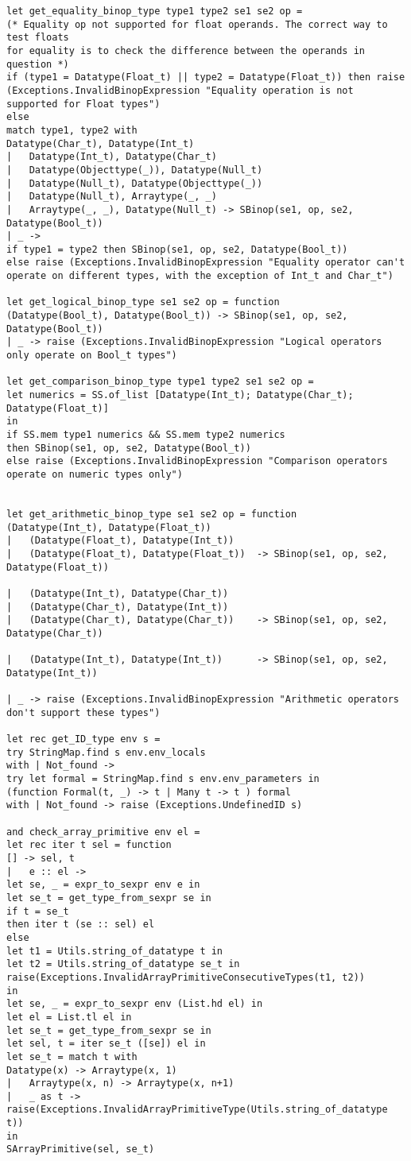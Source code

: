 \begin{verbatim}
let get_equality_binop_type type1 type2 se1 se2 op = 
(* Equality op not supported for float operands. The correct way to test floats 
for equality is to check the difference between the operands in question *)
if (type1 = Datatype(Float_t) || type2 = Datatype(Float_t)) then raise (Exceptions.InvalidBinopExpression "Equality operation is not supported for Float types")
else 
match type1, type2 with
Datatype(Char_t), Datatype(Int_t) 
| 	Datatype(Int_t), Datatype(Char_t)
| 	Datatype(Objecttype(_)), Datatype(Null_t)
| 	Datatype(Null_t), Datatype(Objecttype(_))
| 	Datatype(Null_t), Arraytype(_, _)
| 	Arraytype(_, _), Datatype(Null_t) -> SBinop(se1, op, se2, Datatype(Bool_t))
| _ ->
if type1 = type2 then SBinop(se1, op, se2, Datatype(Bool_t))
else raise (Exceptions.InvalidBinopExpression "Equality operator can't operate on different types, with the exception of Int_t and Char_t")

let get_logical_binop_type se1 se2 op = function 
(Datatype(Bool_t), Datatype(Bool_t)) -> SBinop(se1, op, se2, Datatype(Bool_t))
| _ -> raise (Exceptions.InvalidBinopExpression "Logical operators only operate on Bool_t types")

let get_comparison_binop_type type1 type2 se1 se2 op =  
let numerics = SS.of_list [Datatype(Int_t); Datatype(Char_t); Datatype(Float_t)]
in
if SS.mem type1 numerics && SS.mem type2 numerics
then SBinop(se1, op, se2, Datatype(Bool_t))
else raise (Exceptions.InvalidBinopExpression "Comparison operators operate on numeric types only")


let get_arithmetic_binop_type se1 se2 op = function 
(Datatype(Int_t), Datatype(Float_t)) 
| 	(Datatype(Float_t), Datatype(Int_t)) 
| 	(Datatype(Float_t), Datatype(Float_t)) 	-> SBinop(se1, op, se2, Datatype(Float_t))

| 	(Datatype(Int_t), Datatype(Char_t)) 
| 	(Datatype(Char_t), Datatype(Int_t)) 
| 	(Datatype(Char_t), Datatype(Char_t)) 	-> SBinop(se1, op, se2, Datatype(Char_t))

| 	(Datatype(Int_t), Datatype(Int_t)) 		-> SBinop(se1, op, se2, Datatype(Int_t))

| _ -> raise (Exceptions.InvalidBinopExpression "Arithmetic operators don't support these types")

let rec get_ID_type env s = 
try StringMap.find s env.env_locals
with | Not_found -> 
try let formal = StringMap.find s env.env_parameters in
(function Formal(t, _) -> t | Many t -> t ) formal
with | Not_found -> raise (Exceptions.UndefinedID s)

and check_array_primitive env el = 
let rec iter t sel = function
[] -> sel, t
| 	e :: el -> 
let se, _ = expr_to_sexpr env e in
let se_t = get_type_from_sexpr se in
if t = se_t 
then iter t (se :: sel) el 
else
let t1 = Utils.string_of_datatype t in
let t2 = Utils.string_of_datatype se_t in 
raise(Exceptions.InvalidArrayPrimitiveConsecutiveTypes(t1, t2))
in
let se, _ = expr_to_sexpr env (List.hd el) in
let el = List.tl el in
let se_t = get_type_from_sexpr se in
let sel, t = iter se_t ([se]) el in
let se_t = match t with
Datatype(x) -> Arraytype(x, 1)
| 	Arraytype(x, n) -> Arraytype(x, n+1)
| 	_ as t -> raise(Exceptions.InvalidArrayPrimitiveType(Utils.string_of_datatype t))
in
SArrayPrimitive(sel, se_t)


\end{verbatim}
